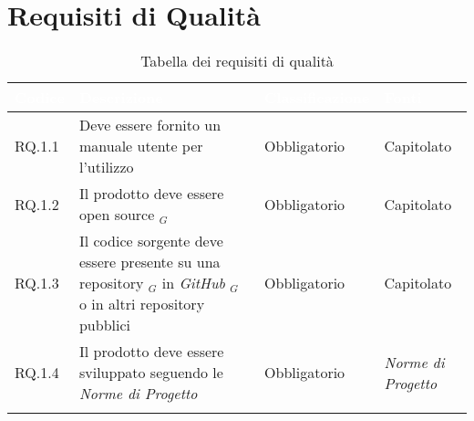 \section{Requisiti di Qualità}
\begin{center}
  \centering
  \begin{longtable}{|L{1,5cm}|C{5,5cm}|C{3cm}|C{2cm}|}
    \hline
    \textcolor[HTML]{FFFFFF}{\textbf{Codice}} & \textcolor[HTML]{FFFFFF}{\textbf{Descrizione}} & \textcolor[HTML]{FFFFFF}{\textbf{Classificazione}} & \textcolor[HTML]{FFFFFF}{\textbf{Fonti}}
    \\ \hline
    RQ.1.1 & Deve essere fornito un manuale utente per l'utilizzo & Obbligatorio & Capitolato \\ \hline
    RQ.1.2 & Il prodotto deve essere open source $_G$ & Obbligatorio & Capitolato \\ \hline
    RQ.1.3 & Il codice sorgente deve essere presente su una repository $_G$ in \textit{GitHub} $_G$ o in altri repository pubblici & Obbligatorio & Capitolato \\ \hline
    RQ.1.4 & Il prodotto deve essere sviluppato seguendo le \textit{Norme di Progetto} & Obbligatorio & \textit{Norme di Progetto} \\ \hline

    \caption{Tabella dei requisiti di qualità}
  \end{longtable}
\end{center}

